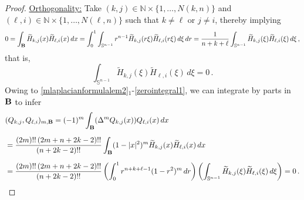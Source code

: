 \documentclass[11pt]{article}
\theoremstyle{plain}
\theoremstyle{definition}
\numberwithin{equation}{section}
\newcommand{\B}{{\bf B}}
\begin{document}
\begin{proof}
\underline{Orthogonality:} Take $(k,j) \in \mathbb{N} \times \{1,\ldots,N(k,n)\}$ and $(\ell,i) \in \mathbb{N} \times \{1,\ldots,N(\ell,n)\}$ such that $k \neq \ell$ or $j \neq i$, thereby implying
$$
0 = \int_{\B} \widetilde{H}_{k,j}(x) \widetilde{H}_{\ell,i}(x) \, dx = \int_{0}^{1} \int_{\mathbb{S}^{n-1}} r^{n-1} \widetilde{H}_{k,j}(r \xi) \widetilde{H}_{\ell,i}(r \xi) \, d\xi \, dr = \dfrac{1}{n + k + \ell} \int_{\mathbb{S}^{n-1}} \widetilde{H}_{k,j}(\xi) \widetilde{H}_{\ell,i}(\xi)  \, d\xi \, ,
$$
that is,
\begin{equation} \label{zerointegral1}
	\int_{\mathbb{S}^{n-1}} \widetilde{H}_{k,j}(\xi) \widetilde{H}_{\ell,i}(\xi) \, d\xi = 0 \, .
\end{equation}
Owing to \eqref{mlaplacianformulalem2}$_1$-\eqref{zerointegral1}, we can integrate by parts in $\B$ to infer
$$
\begin{aligned}
& (Q_{k,j}, Q_{\ell,i})_{m, \B} = (-1)^{m} \int_{\B} (\Delta^{m} Q_{k,j}(x)) Q_{\ell,i}(x) \, dx \\[6pt]
& = \dfrac{(2m)!! \, (2m+n+2k-2)!!}{(n+2k-2)!!} \int_{\B} (1 - |x|^{2})^{m} \widetilde{H}_{k,j}(x) \widetilde{H}_{\ell,i}(x) \, dx \\[6pt]
& = \dfrac{(2m)!! \, (2m+n+2k-2)!!}{(n+2k-2)!!} \left( \int_{0}^{1} r^{n+k+\ell-1} (1 - r^{2})^{m} \, dr \right) \left( \int_{\mathbb{S}^{n-1}} \widetilde{H}_{k,j}(\xi) \widetilde{H}_{\ell,i}(\xi) \, d\xi \right) = 0 \, .
\end{aligned}
$$


\end{proof}
\end{document}
